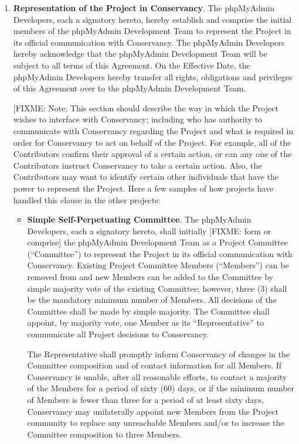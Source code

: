 \documentclass[letterpaper,12pt]{article}
\newcommand{\signatories}{phpMyAdmin Developers\xspace}
\newcommand{\leadershipbody}{phpMyAdmin Development Team\xspace}
\begin{document}
\begin{enumerate}[label=\arabic*.,ref=\S~\arabic*]
\item \textbf{Representation of the Project in Conservancy}. \label{Representation}The
\signatories, each a signatory hereto, hereby establish and comprise
the initial members of the \leadershipbody
to represent the Project in its official communication with Conservancy.
The \signatories hereby acknowledge that the \leadershipbody
will be subject to all terms of this Agreement.
On the Effective Date, the \signatories hereby transfer all
rights, obligations and privileges of this Agreement over to the
\leadershipbody.

[FIXME: Note: This section should describe the way in which the
Project wishes to interface with Conservancy; including who has
authority to communicate with Conservancy regarding the Project
and what is required in order for Conservancy to act on behalf
of the Project. For example, all of the Contributors confirm their
approval of a certain action, or can any one of the Contributors instruct
Conservancy to take a certain action. Also, the Contributors may
want to identify certain other individuals that have the power to
represent the Project. Here a few samples of how projects have handled
this clause in the other projects:

\begin{itemize}
\item \textbf{Simple Self-Perpetuating Committee}. The \signatories,
each a signatory hereto, shall initially [FIXME: form or comprise]
the \leadershipbody as a Project Committee (``Committee'')
to represent the Project in its official communication with Conservancy.
Existing Project Committee Members (``Members'') can be removed
from and new Members can be added to the Committee by simple majority
vote of the existing Committee; however, three (3) shall be the mandatory
minimum number of Members. All decisions of the Committee shall be
made by simple majority. The Committee shall appoint, by majority
vote, one Member as its ``Representative'' to communicate all Project
decisions to Conservancy.


The Representative shall promptly inform Conservancy of changes in
the Committee composition and of contact information for all Members.
If Conservancy is unable, after all reasonable efforts, to contact
a majority of the Members for a period of sixty (60) days, or if the
minimum number of Members is fewer than three for a period of at least
sixty days, Conservancy may unilaterally appoint new Members from
the Project community to replace any unreachable Members and/or to
increase the Committee composition to three Members.


\end{itemize}
\end{enumerate}
\end{document}
